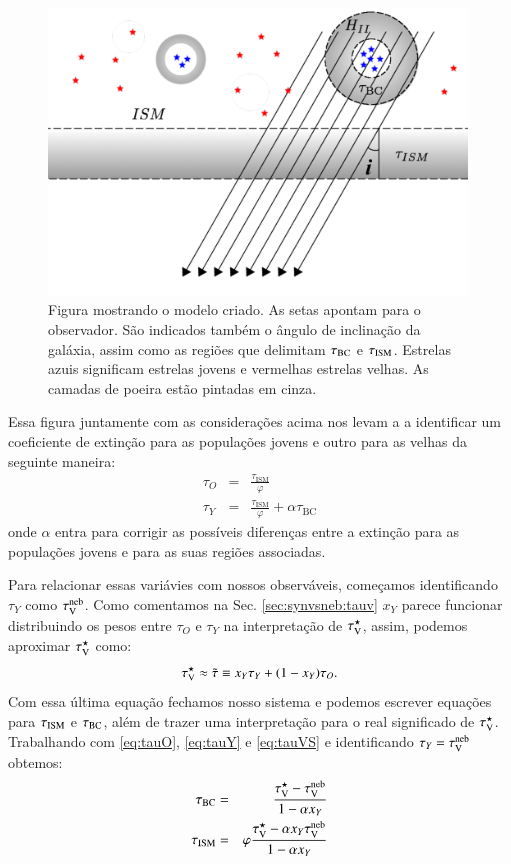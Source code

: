 \begin{figure}
	\includegraphics[width=0.99\textwidth]{figuras/Hiiregion_model.pdf}
	\caption[Modelo para extinção diferencial.]
	{Figura mostrando o modelo criado. As setas apontam para o observador. São indicados também o
ângulo de inclinação da galáxia, assim como as regiões que delimitam $\tau_{\mathrm{BC}}$ e $\tau_{\mathrm{ISM}}$. Estrelas
azuis significam estrelas jovens e vermelhas estrelas velhas. As camadas de poeira estão pintadas
em cinza.}
	\label{fig:model}
\end{figure}

Essa figura juntamente com as considerações acima nos levam a a identificar um coeficiente de
extinção para as populações jovens e outro para as velhas da seguinte maneira:
\begin{eqnarray}
	\tau_O &=& \frac{\tau_{\mathrm{ISM}}}{\varphi} \\
	\label{eq:tauO}
	\tau_Y &=& \frac{\tau_{\mathrm{ISM}}}{\varphi} + \alpha\tau_{\mathrm{BC}}
	\label{eq:tauY} 
\end{eqnarray}
\noindent onde $\alpha$ entra para corrigir as possíveis diferenças entre a extinção para as
populações jovens e para as suas regiões \Hii associadas.

Para relacionar essas variávies com nossos observáveis, começamos identificando $\tau_Y$ como
$\tau_{\mathrm{V}}^{\mathrm{neb}}$. Como comentamos na Sec. \ref{sec:synvsneb:tauv} $x_Y$ parece funcionar distribuindo os
pesos entre $\tau_O$ e $\tau_Y$ na interpretação de $\tau_{\mathrm{V}}^\star$, assim, podemos aproximar $\tau_{\mathrm{V}}^\star$
como:
\begin{equation}
	\tau_{\mathrm{V}}^\star \approx \tilde{\tau} \equiv x_Y \tau_Y + (1 - x_Y) \tau_O.
	\label{eq:tauVS}
\end{equation}
Com essa última equação fechamos nosso sistema e podemos escrever equações para $\tau_{\mathrm{ISM}}$ e
$\tau_{\mathrm{BC}}$, além de trazer uma interpretação para o real significado de $\tau_{\mathrm{V}}^\star$. Trabalhando com
\eqref{eq:tauO}, \eqref{eq:tauY} e \eqref{eq:tauVS} e identificando $\tau_Y = \tau_{\mathrm{V}}^{\mathrm{neb}}$ obtemos:
\begin{eqnarray}
	\tau_{\mathrm{BC}} &=& \frac{\tau_{\mathrm{V}}^\star - \tau_{\mathrm{V}}^{\mathrm{neb}}}{1 - \alpha x_Y} \\
	\label{eq:tauBC}
	\tau_{\mathrm{ISM}} &=& \varphi\frac{\tau_{\mathrm{V}}^\star - \alpha x_Y \tau_{\mathrm{V}}^{\mathrm{neb}}}{1 - \alpha x_Y}  
	\label{eq:tauISM}
\end{eqnarray}

